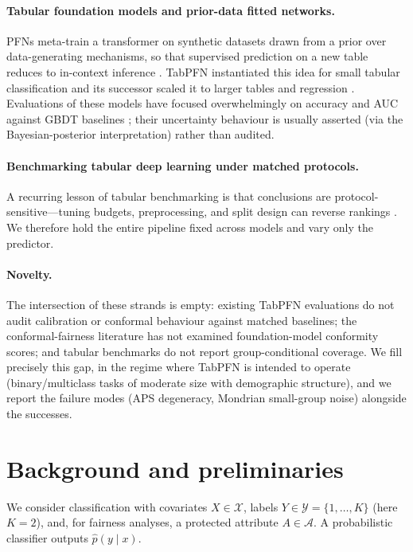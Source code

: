 \documentclass[review,12pt]{elsarticle}
\begin{document}
\paragraph{Tabular foundation models and prior-data fitted networks.}
PFNs meta-train a transformer on synthetic datasets drawn from a prior over data-generating mechanisms, so that supervised prediction on a new table reduces to in-context inference \cite{pfn2022}. TabPFN instantiated this idea for small tabular classification \cite{tabpfn2023} and its successor scaled it to larger tables and regression \cite{tabpfn2025}. Evaluations of these models have focused overwhelmingly on accuracy and AUC against GBDT baselines \cite{grinsztajn2022,mcelfresh2023}; their uncertainty behaviour is usually asserted (via the Bayesian-posterior interpretation) rather than audited.

\paragraph{Benchmarking tabular deep learning under matched protocols.}
A recurring lesson of tabular benchmarking is that conclusions are protocol-sensitive---tuning budgets, preprocessing, and split design can reverse rankings \cite{grinsztajn2022,gorishniy2021}. We therefore hold the entire pipeline fixed across models and vary only the predictor.

\paragraph{Novelty.}
The intersection of these strands is empty: existing TabPFN evaluations do not audit calibration or conformal behaviour against matched baselines; the conformal-fairness literature has not examined foundation-model conformity scores; and tabular benchmarks do not report group-conditional coverage. We fill precisely this gap, in the regime where TabPFN is intended to operate (binary/multiclass tasks of moderate size with demographic structure), and we report the failure modes (APS degeneracy, Mondrian small-group noise) alongside the successes.

\section{Background and preliminaries}
\label{sec:background}

We consider classification with covariates $X \in \mathcal{X}$, labels $Y \in \mathcal{Y} = \{1,\dots,K\}$ (here $K=2$), and, for fairness analyses, a protected attribute $A \in \mathcal{A}$. A probabilistic classifier outputs $\hat p(y \mid x)$.
\end{document}
